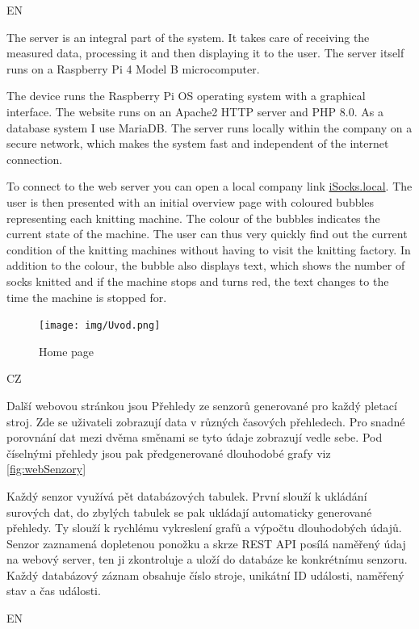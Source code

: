 \documentclass[12pt, a4paper]{article}
\begin{document}
EN

The server is an integral part of the system. It takes care of receiving the measured data, processing it and then displaying it to the user.
The server itself runs on a Raspberry Pi 4 Model B microcomputer.

The device runs the Raspberry Pi OS operating system with a graphical interface.
The website runs on an Apache2 HTTP server and PHP 8.0.
As a database system I use MariaDB.
The server runs locally within the company on a secure network, which makes the system fast and independent of the internet connection.

To connect to the web server you can open a local company link \newline\href{http://iSocks.local}{iSocks.local}.
The user is then presented with an initial overview page with coloured bubbles representing each knitting machine.
The colour of the bubbles indicates the current state of the machine.
The user can thus very quickly find out the current condition of the knitting machines without having to visit the knitting factory.
In addition to the colour, the bubble also displays text, which shows the number of socks knitted and if the machine stops and turns red, the text changes to the time the machine is stopped for.



\begin{figure}[t]
    \centering
    \texttt{[image: img/Uvod.png]}
    \caption{Home page}
    \label{fig:webUvod}
\end{figure}

CZ

Další webovou stránkou jsou Přehledy ze senzorů generované pro každý pletací stroj.
Zde se uživateli zobrazují data v různých časových přehledech.
Pro snadné porovnání dat mezi dvěma směnami se tyto údaje zobrazují vedle sebe.
Pod číselnými přehledy jsou pak předgenerované dlouhodobé grafy viz \ref{fig:webSenzory}

Každý senzor využívá pět databázových tabulek. První slouží k ukládání surových dat, do zbylých tabulek se pak ukládají automaticky generované přehledy.
Ty slouží k rychlému vykreslení grafů a výpočtu dlouhodobých údajů.
Senzor zaznamená dopletenou ponožku a skrze REST API posílá naměřený údaj na webový server, ten ji zkontroluje a uloží do databáze ke konkrétnímu senzoru.
Každý databázový záznam obsahuje číslo stroje, unikátní ID události, naměřený stav a čas události.

EN
\end{document}
